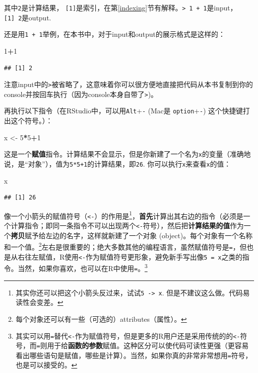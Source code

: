\documentclass[]{book}
\newenvironment{Shaded}{\begin{snugshade}}{\end{snugshade}}
\newcommand{\DecValTok}[1]{\textcolor[rgb]{0.00,0.00,0.81}{#1}}
\newcommand{\NormalTok}[1]{#1}
\newcommand{\OperatorTok}[1]{\textcolor[rgb]{0.81,0.36,0.00}{\textbf{#1}}}
\newcommand{\StringTok}[1]{\textcolor[rgb]{0.31,0.60,0.02}{#1}}
\let\rmarkdownfootnote\footnote%
\def\footnote{\protect\rmarkdownfootnote}
\begin{document}
其中\texttt{2}是计算结果， \texttt{{[}1{]}}是索引，在第\ref{indexing}节有解释。\texttt{\textgreater{}\ 1\ +\ 1}是input，\texttt{{[}1{]}\ 2}是output.

还是用\texttt{1\ +\ 1}举例，在本书中，对于input和output的展示格式是这样的：

\begin{Shaded}
\begin{Highlighting}[]
\DecValTok{1}\OperatorTok{+}\DecValTok{1}
\end{Highlighting}
\end{Shaded}

\begin{verbatim}
## [1] 2
\end{verbatim}

注意input中的\texttt{\textgreater{}}被省略了，这意味着你可以很方便地直接把代码从本书复制到你的console并按回车执行（因为console本身自带了\texttt{\textgreater{}})。

再执行以下指令（在RStudio中，可以用\texttt{Alt}+\texttt{-} (Mac是 \texttt{option}+\texttt{-}) 这个快捷键打出这个符号。）：

\begin{Shaded}
\begin{Highlighting}[]
\NormalTok{x <-}\StringTok{ }\DecValTok{5}\OperatorTok{*}\DecValTok{5}\OperatorTok{+}\DecValTok{1}
\end{Highlighting}
\end{Shaded}

这是一个\textbf{赋值}指令。计算结果不会显示，但是你新建了一个名为\texttt{x}的变量（准确地说，是``对象''），值为\texttt{5*5+1}的计算结果，即\texttt{26}. 你可以执行\texttt{x}来查看\texttt{x}的值：

\begin{Shaded}
\begin{Highlighting}[]
\NormalTok{x}
\end{Highlighting}
\end{Shaded}

\begin{verbatim}
## [1] 26
\end{verbatim}

像一个小箭头的赋值符号（\texttt{\textless{}-}）的作用是\footnote{其实你还可以把这个小箭头反过来，试试\texttt{5\ -\textgreater{}\ x}. 但是不建议这么做。代码易读性会变差。}，\textbf{首先}计算出其右边的指令（必须是一个计算指令；即同一条指令不可以出现两个\texttt{\textless{}-}符号），然后把\textbf{计算结果的值}作为一个\textbf{拷贝}赋予给左边的名字，这样就新建了一个对象 (object)。每个对象有一个名称和一个值。\footnote{每个对象还可以有一些（可选的）attributes（属性）。}左右是很重要的；绝大多数其他的编程语言，虽然赋值符号是\texttt{=}，但也是从右往左赋值，R使用\texttt{\textless{}-}作为赋值符号更形象，避免新手写出像\texttt{5\ =\ x}之类的指令。当然，如果你喜欢，也可以在R中使用\texttt{=}。\footnote{其实可以用\texttt{=}替代\texttt{\textless{}-}作为赋值符号，但是更多的R用户还是采用传统的的\texttt{\textless{}-}符号，而\texttt{=}则用于给\textbf{函数的参数}赋值。这种区分可以使代码可读性更强（更容易看出哪些语句是赋值，哪些是计算）。当然，如果你真的非常非常想用\texttt{=}符号，也是可以接受的。}
\end{document}
